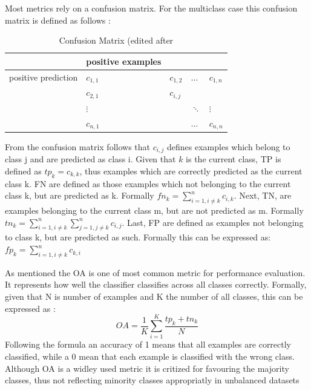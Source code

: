\documentclass[12pt, a4paper, titlepage]{article}
\begin{document}
Most metrics rely on a confusion matrix. For the multiclass case this confusion matrix is defined as follows \citep{Kautz2017}: 
\begin{table}[hb!]
  \center
  \begin{tabular}{lllll}
  \hline
            & positive examples      &           &             &             \\ \hline
  positive prediction  & $c_{1,1}$ & $c_{1,2}$ & $\dots$     & $c_{1,n}$   \\
            & $c_{2,1}$ & $c_{i,j}$ &             &             \\
            &  $\vdots$         &           & $\ddots$ &   $\vdots$\\
            & $c_{n,1}$ &           & $\dots$     & $c_{n,n}$   \\ \hline
  \end{tabular}
  \caption{\label{tab: T1} Confusion Matrix (edited after \citep[113]{Kautz2017}}
  \end{table}

From the confusion matrix follows that $c_{i, j}$ defines examples which belong to class j and are predicted as class i. Given that $k$ is the current class, \ac{TP} is defined as $tp_{k} = c_{k, k}$, thus examples which are correctly predicted as the current class k. \ac{FN} are defined as those examples which not belonging to the current class k, but are predicted as k. Formally $fn_{k} = \sum_{i=1, i \neq k}^n c_{i, k}$. Next, \ac{TN}, are examples belonging to the current class m, but are not predicted as m. Formally $tn_{k} = \sum_{i=1, i\neq k}^n \sum_{j=1, j \neq k}^n c_{i,j}$. Last, \ac{FP} are defined as examples not belonging to class k, but are predicted as such. Formally this can be expressed as: $fp_{k} =  \sum_{i=1, i \neq k}^n c_{k, i}$ \citep{Kautz2017}

As mentioned the \ac{OA} is one of most common metric for performance evaluation. It represents how well the classifier classifies across all classes correctly. Formally, given that N is number of examples and K the number of all classes, this can be expressed as \citep{Branco2017}: 
\[OA = \frac{1}{K} \sum_{i = 1}^K \frac{tp_{k} + tn_{k}}{N}\]
Following the formula an accuracy of 1 means that all examples are correctly classified, while a 0 mean that each example is classified with the wrong class. \citep{Berthold2020}
Although \ac{OA} is a widley used metric it is critized for favouring the majority classes, thus not reflecting minority classes appropriatly in unbalanced datasets \citep{Berthold2020, Fatourechi2008}
\end{document}
